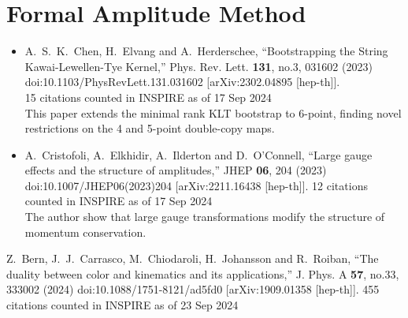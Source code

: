 \documentclass[a4paper,12pt]{article}
\begin{document}
\section*{Formal Amplitude Method}
\begin{itemize}
    \item  %
    A.~S.~K.~Chen, H.~Elvang and A.~Herderschee,
    ``Bootstrapping the String Kawai-Lewellen-Tye Kernel,''
    Phys. Rev. Lett. \textbf{131}, no.3, 031602 (2023)\\
    doi:10.1103/PhysRevLett.131.031602
    [arXiv:2302.04895 [hep-th]].\\
    15 citations counted in INSPIRE as of 17 Sep 2024\\
    This paper extends the minimal rank KLT bootstrap to 6-point, finding novel restrictions on the 4
    and 5-point double-copy maps.
    \item %
    A.~Cristofoli, A.~Elkhidir, A.~Ilderton and D.~O'Connell,
    ``Large gauge effects and the structure of amplitudes,''
    JHEP \textbf{06}, 204 (2023)
    doi:10.1007/JHEP06(2023)204
    [arXiv:2211.16438 [hep-th]].
    12 citations counted in INSPIRE as of 17 Sep 2024\\
    The author show that large gauge transformations modify the structure of momentum conservation.
\end{itemize}
Z.~Bern, J.~J.~Carrasco, M.~Chiodaroli, H.~Johansson and R.~Roiban,
``The duality between color and kinematics and its applications,''
J. Phys. A \textbf{57}, no.33, 333002 (2024)
doi:10.1088/1751-8121/ad5fd0
[arXiv:1909.01358 [hep-th]].
455 citations counted in INSPIRE as of 23 Sep 2024
\end{document}
